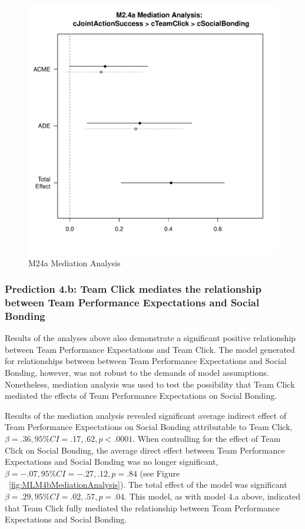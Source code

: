     \begin{figure}[htbp]
      \centering
      \includegraphics[scale=.5]{images/MLM24aMediationAnalysis.pdf}
      \caption{M24a Mediation Analysis}
      \label{fig:MLM24aMediationAnalysis}
    \end{figure}




\subsubsection{Prediction 4.b: Team Click mediates the relationship between Team Performance Expectations and Social Bonding}

  Results of the analyses above also demonstrate a significant positive relationship between Team Performance Expectations and Team Click. The model generated for relationships between between Team Performance Expectations and Social Bonding, however, was not robust to the demands of model assumptions.   Nonetheless, mediation analysis was used to test the possibility that Team Click mediated the effects of Team Performance Expectations on Social Bonding.

  Results of the mediation analysis revealed significant average indirect effect of Team Performance Expectations on Social Bonding attributable to Team Click, $\beta = .36, 95\% CI = .17 , .62, p < .0001$.  When controlling for the effect of Team Click on Social Bonding, the average direct effect between Team Performance Expectations and Social Bonding was no longer significant, $\beta = -.07, 95\% CI = -.27 , .12, p = .84 $ (see Figure ~\ref{fig:MLM4bMediationAnalysis}). The total effect of the model was significant $\beta = .29, 95\% CI = .02 , .57, p = .04$.  This model, as with model 4.a above, indicated that Team Click fully mediated the relationship between Team Performance Expectations and Social Bonding.


